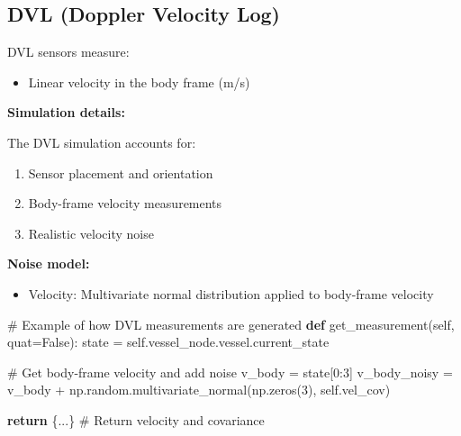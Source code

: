 \documentclass[
  letterpaper,
  DIV=11,
  numbers=noendperiod]{scrreprt}
\newenvironment{Shaded}{\begin{snugshade}}{\end{snugshade}}
\newcommand{\CommentTok}[1]{\textcolor[rgb]{0.37,0.37,0.37}{#1}}
\newcommand{\ControlFlowTok}[1]{\textcolor[rgb]{0.00,0.23,0.31}{\textbf{#1}}}
\newcommand{\DecValTok}[1]{\textcolor[rgb]{0.68,0.00,0.00}{#1}}
\newcommand{\KeywordTok}[1]{\textcolor[rgb]{0.00,0.23,0.31}{\textbf{#1}}}
\newcommand{\NormalTok}[1]{\textcolor[rgb]{0.00,0.23,0.31}{#1}}
\newcommand{\OperatorTok}[1]{\textcolor[rgb]{0.37,0.37,0.37}{#1}}
\newcommand{\VariableTok}[1]{\textcolor[rgb]{0.07,0.07,0.07}{#1}}
\providecommand{\tightlist}{%
  \setlength{\itemsep}{0pt}\setlength{\parskip}{0pt}}\usepackage{longtable,booktabs,array}
\begin{document}
\subsection*{DVL (Doppler Velocity Log)}\label{dvl-doppler-velocity-log}

DVL sensors measure:

\begin{itemize}
\tightlist
\item
  Linear velocity in the body frame (m/s)
\end{itemize}

\textbf{Simulation details:}

The DVL simulation accounts for:

\begin{enumerate}
\def\labelenumi{\arabic{enumi}.}
\tightlist
\item
  Sensor placement and orientation
\item
  Body-frame velocity measurements
\item
  Realistic velocity noise
\end{enumerate}

\textbf{Noise model:}

\begin{itemize}
\tightlist
\item
  Velocity: Multivariate normal distribution applied to body-frame
  velocity
\end{itemize}

\begin{Shaded}
\begin{Highlighting}[]
\CommentTok{\# Example of how DVL measurements are generated}
\KeywordTok{def}\NormalTok{ get\_measurement(}\VariableTok{self}\NormalTok{, quat}\OperatorTok{=}\VariableTok{False}\NormalTok{):}
\NormalTok{    state }\OperatorTok{=} \VariableTok{self}\NormalTok{.vessel\_node.vessel.current\_state}
    
    \CommentTok{\# Get body{-}frame velocity and add noise}
\NormalTok{    v\_body }\OperatorTok{=}\NormalTok{ state[}\DecValTok{0}\NormalTok{:}\DecValTok{3}\NormalTok{]}
\NormalTok{    v\_body\_noisy }\OperatorTok{=}\NormalTok{ v\_body }\OperatorTok{+}\NormalTok{ np.random.multivariate\_normal(np.zeros(}\DecValTok{3}\NormalTok{), }\VariableTok{self}\NormalTok{.vel\_cov)}
    
    \ControlFlowTok{return}\NormalTok{ \{...\}  }\CommentTok{\# Return velocity and covariance}
\end{Highlighting}
\end{Shaded}
\end{document}
